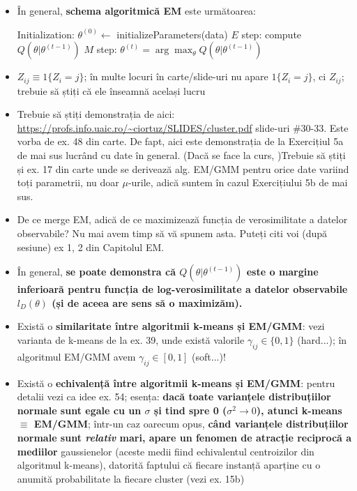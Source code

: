 \documentclass[12pt]{article}
\begin{document}
	\begin{itemize}
		\item În general, \textbf{schema algoritmică EM} este următoarea:
		\begin{algorithmic}
			\STATE Initialization: $\theta^{(0)}\gets$ initializeParameters(data)
			\STATE $E$ step: compute $Q(\theta|\theta^{(t-1)})$
			\STATE $M$ step: $\theta^{(t)} = \arg \max_\theta Q(\theta|\theta^{(t-1)})$
			\ENDFOR
		\end{algorithmic}
		
		\item $Z_{ij} \equiv 1\{Z_i = j\}$; în multe locuri în carte/slide-uri nu apare $1\{Z_i = j\}$, ci $Z_{ij}$; trebuie să știți că ele înseamnă același lucru
		
		\item Trebuie să știți demonstrația de aici: \url{https://profs.info.uaic.ro/~ciortuz/SLIDES/cluster.pdf} slide-uri \#30-33. Este vorba de ex. 48 din carte. De fapt, aici este demonstrația de la Exercițiul 5a de mai sus lucrând cu date în general. (Dacă se face la curs, )Trebuie să știți și ex. 17 din carte unde se derivează alg. EM/GMM pentru orice date variind toți parametrii, nu doar $\mu$-urile, adică suntem în cazul Exercițiului 5b de mai sus.
		
		\item De ce merge EM, adică de ce maximizează funcția de verosimilitate a datelor observabile? Nu mai avem timp să vă spunem asta. Puteți citi voi (după sesiune) ex 1, 2 din Capitolul EM.
		
		\item În general, \textbf{se poate demonstra că $Q(\theta|\theta^{(t-1)})$ este o margine inferioară pentru funcția de log-verosimilitate a datelor observabile $l_D(\theta)$ (și de aceea are sens să o maximizăm).}
		
		\item Există o \textbf{similaritate între algoritmii k-means și EM/GMM}: vezi varianta de k-means de la ex. 39, unde există valorile $\gamma_{ij} \in \{0,1\}$ (hard...); în algoritmul EM/GMM avem $\gamma_{ij} \in [0,1]$ (soft...)!
		
		\item Există o \textbf{echivalență între algoritmii k-means și EM/GMM}: pentru detalii vezi ca idee ex. 54; esența: \textbf{dacă toate varianțele distribuțiilor normale sunt egale cu un $\sigma$ și tind spre 0 ($\sigma^2 \rightarrow 0$), atunci k-means $\equiv$ EM/GMM}; într-un caz oarecum opus, \textbf{când varianțele distribuțiilor normale sunt \textit{relativ} mari, apare un fenomen de \textbf{atracție reciprocă a mediilor}} gaussienelor (aceste medii fiind echivalentul centroizilor din algoritmul k-means), datorită faptului că fiecare instanță aparține cu o anumită probabilitate la fiecare cluster (vezi ex. 15b)
		

\end{itemize}
\end{document}
